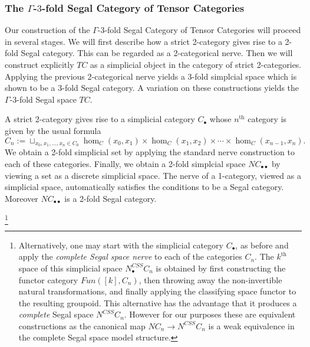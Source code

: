 \documentclass{amsart}
\begin{document}

\subsubsection*{The $\Gamma$-$3$-fold Segal Category of Tensor Categories}

Our construction of the $\Gamma$-$3$-fold Segal Category of Tensor Categories will proceed in several stages. We will first describe how a strict 2-category gives rise to a 2-fold Segal category. This can be regarded as a 2-categorical nerve. Then we will construct explicitly $TC$ as a simplicial object in the category of strict 2-categories. Applying the previous 2-categorical nerve yields a 3-fold simplcial space which is shown to be a 3-fold Segal category. A variation on these constructions yields the $\Gamma$-3-fold Segal space $TC$. 



A strict 2-category gives rise to a simplicial category $C_\bullet$ whose $n^\textrm{th}$ category is given by the usual formula
\begin{equation*}
	C_n := \sqcup_{x_0, x_1, \dots, x_n \in C_0} \hom_C(x_0, x_1) \times \hom_C(x_1, x_2) \times \cdots \times \hom_C(x_{n-1}, x_n).
\end{equation*}
We obtain a 2-fold simplicial set by applying the standard nerve construction to each of these categories. Finally, we obtain a 2-fold simplcial space $NC_{\bullet \bullet}$ by viewing a set as a discrete simplicial space. The nerve of a 1-category, viewed as a simplicial space, automatically satisfies the conditions to be a Segal category. Moreover $NC_{\bullet \bullet}$ is a 2-fold Segal category. 

\footnote{Alternatively, one may start with the simplicial category $C_\bullet$, as before and apply the {\em complete Segal space nerve} to each of the categories $C_n$. The $k^\text{th}$ space of this simplicial space $N^{CSS}_\bullet C_n$ is obtained by first constructing the functor category $Fun([k], C_n)$, then throwing away the non-invertible natural transformations, and finally applying the classifying space functor to the resulting groupoid. This alternative has the advantage that it produces a {\em complete} Segal space $N^{CSS} C_n$. However for our purposes these are equivalent constructions as the canonical map $N C_n \to N^{CSS} C_n$ is a weak equivalence in the complete Segal space model structure. 
}
\end{document}
